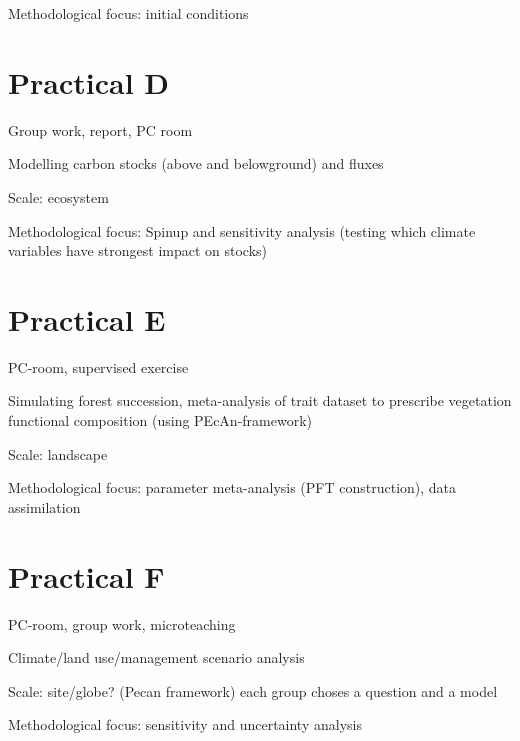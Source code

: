 \documentclass[
  oneside]{book}
\begin{document}
Methodological focus: initial conditions

\hypertarget{practical-d}{%
\chapter*{Practical D}\label{practical-d}}

Group work, report, PC room

Modelling carbon stocks (above and belowground) and fluxes

Scale: ecosystem

Methodological focus: Spinup and sensitivity analysis (testing which climate variables have strongest impact on stocks)

\hypertarget{practical-e}{%
\chapter*{Practical E}\label{practical-e}}

PC-room, supervised exercise

Simulating forest succession, meta-analysis of trait dataset to prescribe vegetation functional composition (using PEcAn-framework)

Scale: landscape

Methodological focus: parameter meta-analysis (PFT construction), data assimilation

\hypertarget{practical-f}{%
\chapter*{Practical F}\label{practical-f}}

PC-room, group work, microteaching

Climate/land use/management scenario analysis

Scale: site/globe? (Pecan framework) each group choses a question and a model

Methodological focus: sensitivity and uncertainty analysis

  
\end{document}

